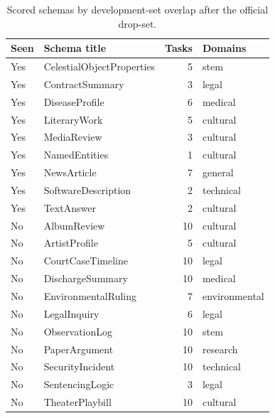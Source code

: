 \begin{table}[!htbp]
\centering
\caption{Scored schemas by development-set overlap after the official drop-set.}
\label{tab:test-schema-overlap}
\scriptsize
\begin{tabularx}{\linewidth}{@{}llr>{\raggedright\arraybackslash}X@{}}
\toprule
Seen & Schema title & Tasks & Domains \\
\midrule
Yes & CelestialObjectProperties & 5 & stem \\
Yes & ContractSummary & 3 & legal \\
Yes & DiseaseProfile & 6 & medical \\
Yes & LiteraryWork & 5 & cultural \\
Yes & MediaReview & 3 & cultural \\
Yes & NamedEntities & 1 & cultural \\
Yes & NewsArticle & 7 & general \\
Yes & SoftwareDescription & 2 & technical \\
Yes & TextAnswer & 2 & cultural \\
\midrule
No & AlbumReview & 10 & cultural \\
No & ArtistProfile & 5 & cultural \\
No & CourtCaseTimeline & 10 & legal \\
No & DischargeSummary & 10 & medical \\
No & EnvironmentalRuling & 7 & environmental \\
No & LegalInquiry & 6 & legal \\
No & ObservationLog & 10 & stem \\
No & PaperArgument & 10 & research \\
No & SecurityIncident & 10 & technical \\
No & SentencingLogic & 3 & legal \\
No & TheaterPlaybill & 10 & cultural \\
\bottomrule
\end{tabularx}
\end{table}

